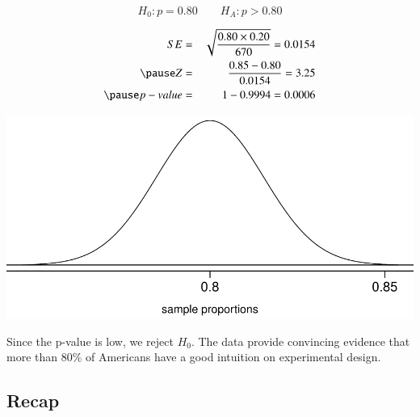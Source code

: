 
\begin{frame}
\frametitle{}


\pause 

\[ H_0: p = 0.80 \qquad H_A: p > 0.80 \]

{
\pause
\begin{eqnarray*}
SE &=& \sqrt{\frac{0.80 \times 0.20}{670}} = 0.0154 \\
\pause
Z &=& \frac{0.85 - 0.80}{0.0154} = 3.25 \\
\pause
p-value &=& 1 - 0.9994 = 0.0006 \\
\end{eqnarray*}
}
{
\begin{center}
\includegraphics[width=\textwidth]{6-1_single_prop/figures/expdesgn_norm}
\end{center}
}
\pause
Since the p-value is low, we reject $H_0$. The data provide convincing evidence that more than 80\% of Americans have a good intuition on experimental design.

\end{frame}


\subsection{Recap}


